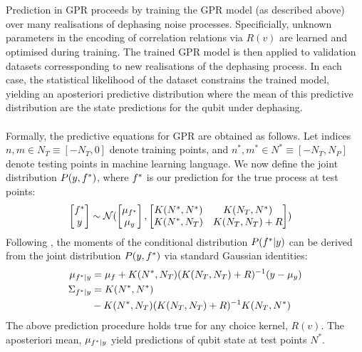 \\
\\
Prediction in GPR proceeds by training the GPR model (as described above) over many realisations of dephasing noise processes. Specificially, unknown parameters in the encoding of correlation relations via $R(v)$ are learned and optimised during training. The trained GPR model is then applied to  validation datasets corressponding to new realisations of the dephasing process. In each case, the statistical likelihood of the dataset constrains the trained model, yielding an aposteriori predictive distribution where the mean of this predictive distribution are the state predictions for the qubit under dephasing. 
\\
\\
Formally, the predictive equations for GPR are obtained as follows. Let indices $n,m \in N_T \equiv [-N_T, 0]$ denote training points, and $n^*,m^* \in N^* \equiv [-N_T, N_P]$ denote testing points in machine learning language. We now define the joint distribution $P(y,f^*)$, where $f^*$ is our prediction for the true process at test points: 
\begin{align}
\begin{bmatrix} f^* \\y \end{bmatrix} & \sim \mathcal{N} (\begin{bmatrix} \mu_{f^*} \\ \mu_y
\end{bmatrix} , \begin{bmatrix}   K(N^*,N^*)&K(N_T,N^*) \\ K(N^*,N_T) & K(N_T,N_T) + R \end{bmatrix} )
\end{align}
Following \cite{rasmussen2006}, the moments of the conditional distribution $P(f^*|y)$ can be derived from the joint distribution $P(y,f^*)$ via standard Gaussian identities:
\begin{align}
\mu_{f^*|y} &= \mu_f + K(N^*,N_T)(K(N_T,N_T) + R )^{-1} (y - \mu_y) \\
\Sigma_{f^*|y} &= K(N^*,N^*) \nonumber \\
& - K(N^*,N_T)(K(N_T, N_T) + R)^{-1}K(N_T,N^*) 
\end{align}
The above prediction procedure holds true for any choice kernel, $R(v)$. The aposteriori mean, $\mu_{f^*|y}$ yield predictions of qubit state at test points $N^*$.
\\
\\
